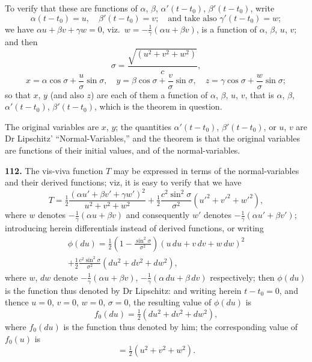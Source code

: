 \documentclass[11pt,a4paper]{book}
\begin{document}
To verify that these are functions of $\alpha$, $\beta$, $\alpha'(t - t_0)$, $\beta'(t - t_0)$, write
\[
\alpha(t - t_0) = u, \quad \beta'(t - t_0) = v; \quad \text{and take also } \gamma'(t - t_0) = w;
\]
we have $\alpha u + \beta v + \gamma w = 0$, viz.\ $w = -\frac{1}{\gamma}(\alpha u + \beta v)$, is a function of $\alpha$, $\beta$, $u$, $v$; and then
\[
\sigma = \frac{\sqrt{(u^2 + v^2 + w^2)}}{c},
\]
\[
x = \alpha\cos\sigma + \frac{u}{\sigma}\sin\sigma, \quad
y = \beta\cos\sigma + \frac{v}{\sigma}\sin\sigma, \quad
z = \gamma\cos\sigma + \frac{w}{\sigma}\sin\sigma;
\]
so that $x$, $y$ (and also $z$) are each of them a function of $\alpha$, $\beta$, $u$, $v$, that is $\alpha$, $\beta$, $\alpha'(t - t_0)$, $\beta'(t - t_0)$, which is the theorem in question.

The original variables are $x$, $y$; the quantities $\alpha'(t - t_0)$, $\beta'(t - t_0)$, or $u$, $v$ are Dr Lipschitz' ``Normal-Variables,'' and the theorem is that the original variables are functions of their initial values, and of the normal-variables.


\noindent\textbf{112.} The vis-viva function $T$ may be expressed in terms of the normal-variables and their derived functions; viz, it is easy to verify that we have
\[
T = \tfrac{1}{2}\frac{(\alpha u' + \beta v' + \gamma w')^2}{u^2 + v^2 + w^2} + \tfrac{1}{2}\frac{c^2\sin^2\sigma}{\sigma^2}(u'^2 + v'^2 + w'^2),
\]
where $w$ denotes $-\frac{1}{\gamma}(\alpha u + \beta v)$ and consequently $w'$ denotes $-\frac{1}{\gamma}(\alpha u' + \beta v')$; introducing herein differentials instead of derived functions, or writing
\begin{multline*}
\phi(du) = \tfrac{1}{2}\left(1 - \frac{\sin^2\sigma}{\sigma^2}\right)(u\,du + v\,dv + w\,dw)^2 \\
+ \tfrac{1}{2}\frac{c^2\sin^2\sigma}{\sigma^2}(du^2 + dv^2 + dw^2),
\end{multline*}
where $w$, $dw$ denote $-\frac{1}{\gamma}(\alpha u + \beta v)$, $-\frac{1}{\gamma}(\alpha\,du + \beta\,dv)$ respectively; then $\phi(du)$ is the function thus denoted by Dr Lipschitz: and writing herein $t - t_0 = 0$, and thence $u = 0$, $v = 0$, $w = 0$, $\sigma = 0$, the resulting value of $\phi(du)$ is
\[
f_0(du) = \tfrac{1}{2}(du^2 + dv^2 + dw^2),
\]
where $f_0(du)$ is the function thus denoted by him; the corresponding value of $f_0(u)$ is
\[
= \tfrac{1}{2}(u^2 + v^2 + w^2).
\]
\end{document}
